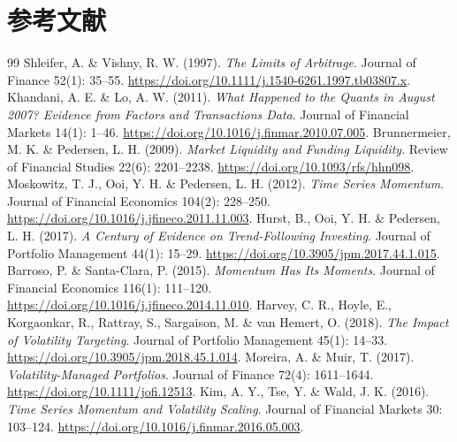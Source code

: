 \section*{参考文献}
\begin{thebibliography}{99}
\small
{} Shleifer, A. \& Vishny, R. W. (1997). \emph{The Limits of Arbitrage}. Journal of Finance 52(1): 35--55. \href{https://doi.org/10.1111/j.1540-6261.1997.tb03807.x}{https://doi.org/10.1111/j.1540-6261.1997.tb03807.x}.
 Khandani, A. E. \& Lo, A. W. (2011). \emph{What Happened to the Quants in August 2007? Evidence from Factors and Transactions Data}. Journal of Financial Markets 14(1): 1--46. \href{https://doi.org/10.1016/j.finmar.2010.07.005}{https://doi.org/10.1016/j.finmar.2010.07.005}.
 Brunnermeier, M. K. \& Pedersen, L. H. (2009). \emph{Market Liquidity and Funding Liquidity}. Review of Financial Studies 22(6): 2201--2238. \href{https://doi.org/10.1093/rfs/hhn098}{https://doi.org/10.1093/rfs/hhn098}.
 Moskowitz, T. J., Ooi, Y. H. \& Pedersen, L. H. (2012). \emph{Time Series Momentum}. Journal of Financial Economics 104(2): 228--250. \href{https://doi.org/10.1016/j.jfineco.2011.11.003}{https://doi.org/10.1016/j.jfineco.2011.11.003}.
 Hurst, B., Ooi, Y. H. \& Pedersen, L. H. (2017). \emph{A Century of Evidence on Trend-Following Investing}. Journal of Portfolio Management 44(1): 15--29. \href{https://doi.org/10.3905/jpm.2017.44.1.015}{https://doi.org/10.3905/jpm.2017.44.1.015}.
 Barroso, P. \& Santa-Clara, P. (2015). \emph{Momentum Has Its Moments}. Journal of Financial Economics 116(1): 111--120. \href{https://doi.org/10.1016/j.jfineco.2014.11.010}{https://doi.org/10.1016/j.jfineco.2014.11.010}.
 Harvey, C. R., Hoyle, E., Korgaonkar, R., Rattray, S., Sargaison, M. \& van Hemert, O. (2018). \emph{The Impact of Volatility Targeting}. Journal of Portfolio Management 45(1): 14--33. \href{https://doi.org/10.3905/jpm.2018.45.1.014}{https://doi.org/10.3905/jpm.2018.45.1.014}.
 Moreira, A. \& Muir, T. (2017). \emph{Volatility-Managed Portfolios}. Journal of Finance 72(4): 1611--1644. \href{https://doi.org/10.1111/jofi.12513}{https://doi.org/10.1111/jofi.12513}.
 Kim, A. Y., Tse, Y. \& Wald, J. K. (2016). \emph{Time Series Momentum and Volatility Scaling}. Journal of Financial Markets 30: 103--124. \href{https://doi.org/10.1016/j.finmar.2016.05.003}{https://doi.org/10.1016/j.finmar.2016.05.003}.

\end{thebibliography}
